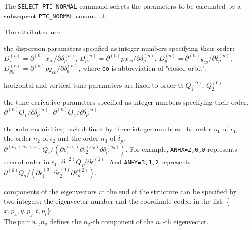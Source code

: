 The \texttt{SELECT\_PTC\_NORMAL} command selects the parameters to be 
calculated by a subsequent \texttt{PTC\_NORMAL} command.


The attributes are: 
\begin{madlist}
   the dispersion paramaters specified as
  integer numbers specifying their order:  
  $D_x^{(n)} = \partial^{(n)} x_{co} / \partial \delta_p^{(n)}$, 
  $D_{px}^{(n)} = \partial^{(n)} px_{co} / \partial \delta_p^{(n)}$, 
  $D_y^{(n)} = \partial^{(n)} y_{co} / \partial \delta_p^{(n)}$, 
  $D_{py}^{(n)} = \partial^{(n)} py_{co} / \partial \delta_p^{(n)}$,
  where \texttt{co} is abbreviation of "closed orbit".

   horizontal and vertical tune paramaters are fixed to
  order 0: $Q_1^{(0)}$,  $Q_2^{(0)}$
  
   the tune derivative parameters specified as
  integer numbers specifying their order. 
  $\partial^{(n)} Q_1 / \partial \delta_p^{(n)}$, 
  $\partial^{(n)} Q_2 / \partial \delta_{p}^{(n)}$
  
  
   the anharmonicities, each defined by three integer
  numbers: the order $n_1$ of $\epsilon_1$, the order $n_2$ of
  $\epsilon_2$ and the order $n_3$ of $\delta_p$.
  $\partial^{(n_1 + n_2 + n_3)} Q_z / (
  \partial\epsilon_1^{(n_1)} \partial\epsilon_2^{(n_2)}
  \partial\delta_p^{(n_3)})$.
  For example, \texttt{ANHX=2,0,0} represents second order
  in $\epsilon_1$:  $\partial^{(2)} Q_1 / \partial \epsilon_1^{(2)}$. 
  And \texttt{ANHY=3,1,2} represents $\partial^{(6)} Q_2 / (
  \partial\epsilon_1^{(3)} \partial\epsilon_2^{(1)}
  \partial\delta_p^{(2)})$.

   components of the eigenvectors at the end of the structure
  can be specified by two integers: the eigenvector number and the
  coordinate coded in the list: \{$x, p_x, y, p_y, t, p_t$\}: \\
  The pair $n_1$,$n_2$ defines the $n_2$-th component of
  the $n_1$-th eigenvector. 
  

\end{madlist}
